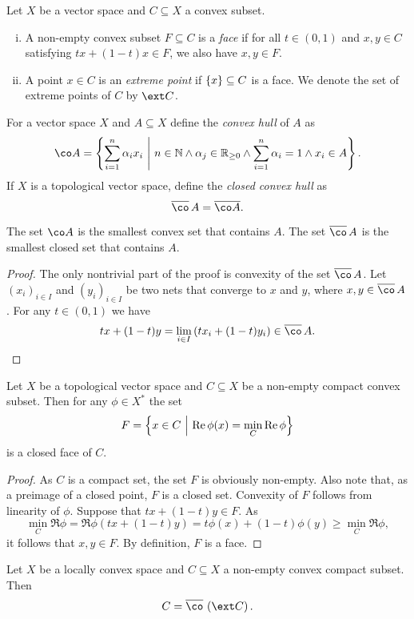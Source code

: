 \begin{definicija}
Let $X$ be a vector space and $C \subseteq X$ a convex subset.

\begin{enumerate}[i)]
\item A non-empty convex subset $F \subseteq C$ is a
\emph{face} if for all $t \in (0, 1)$ and $x, y \in C$
satisfying $tx + (1-t)x \in F$, we also have $x, y \in F$.
\item A point $x \in C$ is an
\emph{extreme point} if $\left\{x\right\} \subseteq C$
is a face. We denote the set of extreme points of $C$ by $\ext C$.
\end{enumerate}
\end{definicija}

\begin{definicija}
For a vector space $X$ and $A \subseteq X$ define the
\emph{convex hull} of $A$ as
\[
\co A =
\setb{\sum_{i=1}^n \alpha_i x_i}
{n \in \N \land \alpha_j \in \R_{\geq 0} \land
\sum_{i=1}^n \alpha_i = 1 \land x_i \in A}.
\]
If $X$ is a topological vector space, define the
\emph{closed convex hull} as
\[
\oline{\co}\,A = \oline{\co A}.
\]
\end{definicija}

\begin{trditev}
The set $\co A$ is the smallest convex set that contains $A$. The
set $\oline{\co}\,A$ is the smallest closed set that contains $A$.
\end{trditev}

\begin{proof}
The only nontrivial part of the proof is convexity of the set
$\oline{\co}\,A$. Let $(x_i)_{i \in I}$ and $(y_i)_{i \in I}$ be
two nets that converge to $x$ and $y$, where
$x, y \in \oline{\co}\,A$. For any $t \in (0, 1)$ we have
\[
tx + (1-t)y =
\lim_{i \in I} \br{t x_i + (1-t) y_i} \in
\oline{\co}\,A. \qedhere
\]
\end{proof}

\begin{lema}
Let $X$ be a topological vector space and $C \subseteq X$ be a
non-empty compact convex subset. Then for any $\phi \in X^*$ the
set
\[
F = \left\{x \in C~\middle\vert~\operatorname{Re} \phi(x) = \min_C \operatorname{Re} \phi\right\}
\]
is a closed face of $C$.
\end{lema}

\begin{proof}
As $C$ is a compact set, the set $F$ is obviously non-empty. Also
note that, as a preimage of a closed point, $F$ is a closed set.
Convexity of $F$ follows from linearity of $\phi$. Suppose that
$tx + (1-t)y \in F$. As
\[
\min_C \Re \phi =
\Re \phi(tx + (1-t)y) =
t \phi(x) + (1-t) \phi(y) \geq
\min_C \Re \phi,
\]
it follows that $x, y \in F$. By definition, $F$ is a face.
\end{proof}

\begin{izrek}
Let $X$ be a locally convex space and $C \subseteq X$ a non-empty
convex compact subset. Then
\[
C = \oline{\co}\, \br{\ext C}.
\]
\end{izrek}
